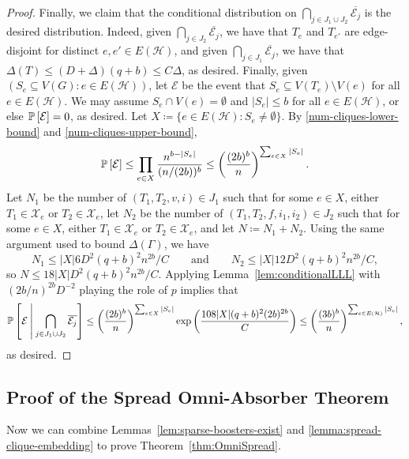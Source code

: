 \documentclass[11pt]{article}
\numberwithin{equation}{section}
\newcounter{i}
\theoremstyle{plain}
\theoremstyle{plain} %
\theoremstyle{definition}
\newcommand{\cE}{\mathcal{E}}
\newcommand{\cH}{\mathcal{H}}
\newcommand{\cX}{\mathcal{X}}
\newcommand{\Prob}[1]{\ensuremath{%
\mathbb P\left[#1\right]
}}
\newcommand{\ProbCond}[2]{\ensuremath{%
    \mathbb P\left[#1\:\middle|\:#2\right]
  }}
\begin{document}
\begin{proof}
    Finally, we claim that the conditional distribution on $\bigcap_{j \in J_1 \cup J_2}\overline{\cE_j}$ is the desired distribution.  Indeed, given $\bigcap_{j \in J_2}\overline{\cE_j}$, we have that $T_{e}$ and $T_{e'}$ are edge-disjoint for distinct $e, e' \in E(\cH)$, and given $\bigcap_{j \in J_1}\overline{\cE_j}$, we have that $\Delta(T) \leq (D + \Delta)(q + b) \leq C\Delta$, as desired.  
    Finally, given $(S_e \subseteq V(G) : e \in E(\cH))$, let $\cE$ be the event that $S_e \subseteq V(T_e) \setminus V(e)$ for all $e \in E(\cH)$. We may assume $S_e \cap V(e) = \emptyset$ and $|S_e| \leq b$ for all $e \in E(\cH)$, or else $\Prob{\cE} = 0$, as desired.  Let $X \coloneqq \{e \in E(\cH) : S_e \neq \emptyset\}$.  By \ref{num-cliques-lower-bound} and \ref{num-cliques-upper-bound}, 
    \begin{equation*}
        \Prob{\cE} \leq \prod_{e\in X}\frac{n^{b - |S_e|}}{(n/(2b))^b} \leq \left(\frac{(2b)^b}{n}\right)^{\sum_{e\in X}|S_e|}.
    \end{equation*}
    Let $N_1$ be the number of $(T_1, T_2, v, i) \in J_1$ such that for some $e \in X$, either $T_1 \in \cX_e$ or $T_2 \in \cX_e$, let $N_2$ be the number of $(T_1, T_2, f, i_1, i_2) \in J_2$ such that for some $e \in X$, either $T_1 \in \cX_e$ or $T_2 \in \cX_e$, and let $N \coloneqq N_1 + N_2$.  Using the same argument used to bound $\Delta(\Gamma)$, we have
    \begin{equation*}
        N_1 \leq |X|6D^2 (q + b)^2 n^{2b}/C\qquad\text{and}\qquad N_2 \leq |X|12D^2 (q + b)^2n^{2b}/C,
    \end{equation*} 
    so $N \leq 18|X|D^2(q + b)^2n^{2b}/C$.  Applying Lemma~\ref{lem:conditionalLLL} with $(2b / n)^{2b}D^{-2}$ playing the role of $p$ implies that 
    \begin{equation*}
        \ProbCond{\cE}{\bigcap_{j \in J_1 \cup J_2}\overline{\cE_j}} \leq \left(\frac{(2b)^b}{n}\right)^{\sum_{e\in X}|S_e|}\exp\left(\frac{108|X|(q + b)^2(2b)^{2b}}{C}\right) \leq \left(\frac{(3b)^b}{n}\right)^{\sum_{e\in E(\cH)}|S_e|},
    \end{equation*}
    as desired.
\end{proof}

\subsection{Proof of the Spread Omni-Absorber Theorem}

Now we can combine Lemmas~\ref{lem:sparse-boosters-exist} and \ref{lemma:spread-clique-embedding} to prove Theorem~\ref{thm:OmniSpread}.
\end{document}
